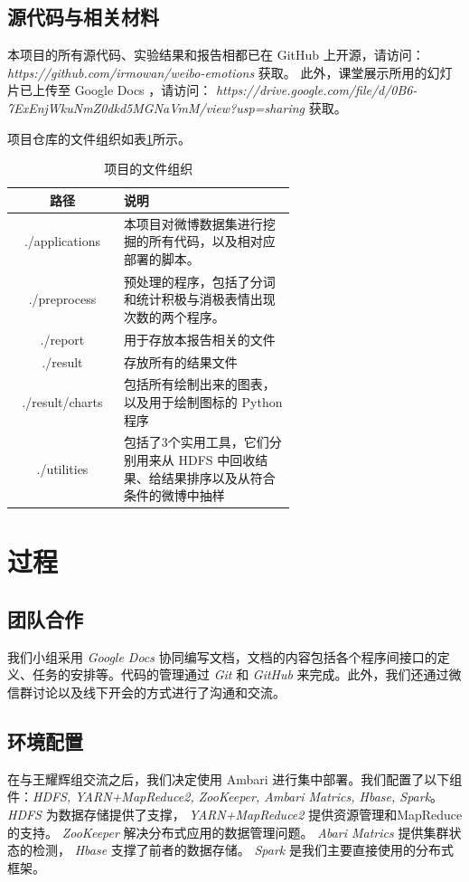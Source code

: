 \documentclass[12pt, oneside]{article}
\begin{document}
\begin{spacing}{1.5}
\begin{CJK}{UTF8}{gbsn}
\subsection{源代码与相关材料}
本项目的所有源代码、实验结果和报告相都已在 GitHub 上开源，请访问： {\it https://github.com/irmowan/weibo-emotions} 获取。
此外，课堂展示所用的幻灯片已上传至 Google Docs ，请访问： {\it https://drive.google.com/file/d/0B6-7ExEnjWkuNmZ0dkd5MGNaVmM/view?usp=sharing} 获取。

项目仓库的文件组织如表\ref{tbl:files_organization}所示。
\begin{table}[]
\centering
\begin{tabular}{|c|p{0.618\linewidth}|}
\hline
路径              & 说明                               \\ \hline
./applications  & 本项目对微博数据集进行挖掘的所有代码，以及相对应部署的脚本。    \\ \hline
./preprocess    & 预处理的程序，包括了分词和统计积极与消极表情出现次数的两个程序。 \\ \hline
./report        & 用于存放本报告相关的文件                     \\ \hline
./result        & 存放所有的结果文件                        \\ \hline
./result/charts & 包括所有绘制出来的图表，以及用于绘制图标的 Python 程序    \\ \hline
./utilities     & 包括了3个实用工具，它们分别用来从 HDFS 中回收结果、给结果排序以及从符合条件的微博中抽样        \\ \hline
\end{tabular}
\caption{项目的文件组织}
\label{tbl:files_organization}
\end{table}

\section{过程}
\subsection{团队合作}
我们小组采用 {\it Google Docs} 协同编写文档，文档的内容包括各个程序间接口的定义、任务的安排等。代码的管理通过 {\it Git} 和 {\it GitHub} 来完成。此外，我们还通过微信群讨论以及线下开会的方式进行了沟通和交流。

\subsection{环境配置}
在与王耀辉组交流之后，我们决定使用 Ambari 进行集中部署。我们配置了以下组件：{\it HDFS, YARN+MapReduce2, ZooKeeper, Ambari  Matrics, Hbase, Spark}。 {\it HDFS} 为数据存储提供了支撑， {\it YARN+MapReduce2} 提供资源管理和MapReduce的支持。 {\it ZooKeeper} 解决分布式应用的数据管理问题。 {\it Abari Matrics} 提供集群状态的检测， {\it Hbase} 支撑了前者的数据存储。 {\it Spark} 是我们主要直接使用的分布式框架。


\end{CJK}
\end{spacing}
\end{document}
